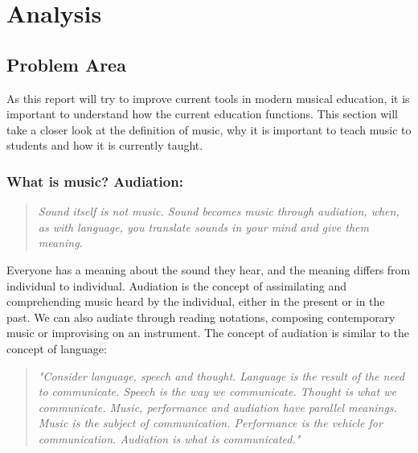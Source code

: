 \chapter{Analysis}

\section{Problem Area}
		As this report will try to improve current tools in modern musical education, it is important to understand how the current education functions. This section will take a closer look at the definition of music, why it is important to teach music to students and how it is currently taught.\\
		
	\subsection{What is music? Audiation:}
	\begin{quote}
	\textit{Sound itself is not music. Sound becomes music through audiation, when, as with language, you translate sounds in your mind and give them meaning.}\\
	\end{quote}
	
	Everyone has a meaning about the sound they hear, and the meaning differs from individual to individual. Audiation is the concept of assimilating and comprehending music heard by the individual, either in the present or in the past. We can also audiate through reading notations, composing contemporary music or improvising on an instrument.
	The concept of audiation is similar to the concept of language:\\
	
	\begin{quote}
	\textit{"Consider language, speech and thought. Language is the result of the need to communicate. Speech is the way we communicate. Thought is what we communicate. Music, performance and audiation have parallel meanings. Music is the subject of communication. Performance is the vehicle for communication. Audiation is what is communicated."}\\
    \end{quote}
	
